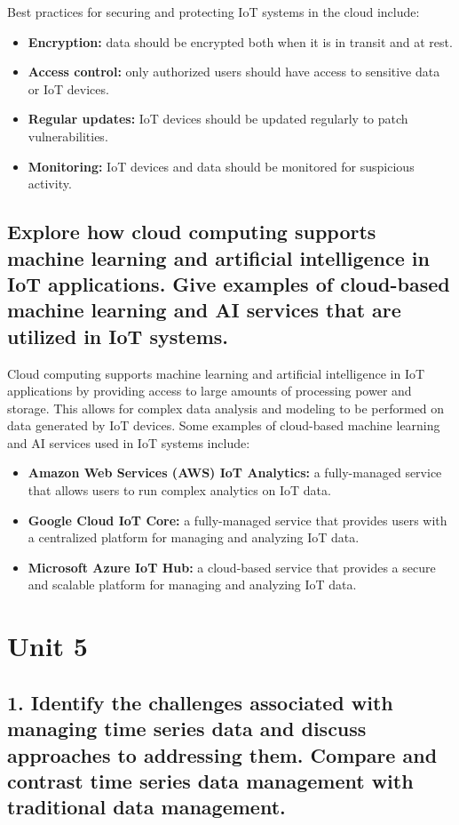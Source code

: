 \documentclass[12pt, a4paper, oneside]{article}
\begin{document}
Best practices for securing and protecting IoT systems in the cloud include:

\begin{itemize}
	\item \textbf{Encryption:} data should be encrypted both when it is in transit and at rest.
	\item \textbf{Access control:} only authorized users should have access to sensitive data or IoT devices.
	\item \textbf{Regular updates:} IoT devices should be updated regularly to patch vulnerabilities.
	\item \textbf{Monitoring:} IoT devices and data should be monitored for suspicious activity.
\end{itemize}

\subsection{Explore how cloud computing supports machine learning and artificial intelligence in IoT applications. Give examples of cloud-based machine learning and AI services that are utilized in IoT systems.}

Cloud computing supports machine learning and artificial intelligence in IoT applications by providing access to large amounts of processing power and storage. This allows for complex data analysis and modeling to be performed on data generated by IoT devices. Some examples of cloud-based machine learning and AI services used in IoT systems include:

\begin{itemize}
	\item \textbf{Amazon Web Services (AWS) IoT Analytics:} a fully-managed service that allows users to run complex analytics on IoT data.
	\item \textbf{Google Cloud IoT Core:} a fully-managed service that provides users with a centralized platform for managing and analyzing IoT data.
	\item \textbf{Microsoft Azure IoT Hub:} a cloud-based service that provides a secure and scalable platform for managing and analyzing IoT data.
\end{itemize}

\section{Unit 5}

\subsection{1. Identify the challenges associated with managing time series data and discuss approaches to addressing them. Compare and contrast time series data management with traditional data management.}
\end{document}
